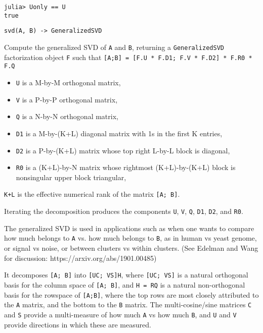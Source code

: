 \begin{adjustwidth}{2em}{0pt}
\begin{verbatim}
julia> Uonly == U
true
\end{verbatim}




\begin{lstlisting}
svd(A, B) -> GeneralizedSVD
\end{lstlisting}

Compute the generalized SVD of \texttt{A} and \texttt{B}, returning a \texttt{GeneralizedSVD} factorization object \texttt{F} such that \texttt{[A;B] = [F.U * F.D1; F.V * F.D2] * F.R0 * F.Q{\textquotesingle}}

\begin{itemize}
\item \texttt{U} is a M-by-M orthogonal matrix,


\item \texttt{V} is a P-by-P orthogonal matrix,


\item \texttt{Q} is a N-by-N orthogonal matrix,


\item \texttt{D1} is a M-by-(K+L) diagonal matrix with 1s in the first K entries,


\item \texttt{D2} is a P-by-(K+L) matrix whose top right L-by-L block is diagonal,


\item \texttt{R0} is a (K+L)-by-N matrix whose rightmost (K+L)-by-(K+L) block is          nonsingular upper block triangular,

\end{itemize}
\texttt{K+L} is the effective numerical rank of the matrix \texttt{[A; B]}.

Iterating the decomposition produces the components \texttt{U}, \texttt{V}, \texttt{Q}, \texttt{D1}, \texttt{D2}, and \texttt{R0}.

The generalized SVD is used in applications such as when one wants to compare how much belongs to \texttt{A} vs. how much belongs to \texttt{B}, as in human vs yeast genome, or signal vs noise, or between clusters vs within clusters. (See Edelman and Wang for discussion: https://arxiv.org/abs/1901.00485)

It decomposes \texttt{[A; B]} into \texttt{[UC; VS]H}, where \texttt{[UC; VS]} is a natural orthogonal basis for the column space of \texttt{[A; B]}, and \texttt{H = RQ{\textquotesingle}} is a natural non-orthogonal basis for the rowspace of \texttt{[A;B]}, where the top rows are most closely attributed to the \texttt{A} matrix, and the bottom to the \texttt{B} matrix. The multi-cosine/sine matrices \texttt{C} and \texttt{S} provide a multi-measure of how much \texttt{A} vs how much \texttt{B}, and \texttt{U} and \texttt{V} provide directions in which these are measured.


\end{adjustwidth}
